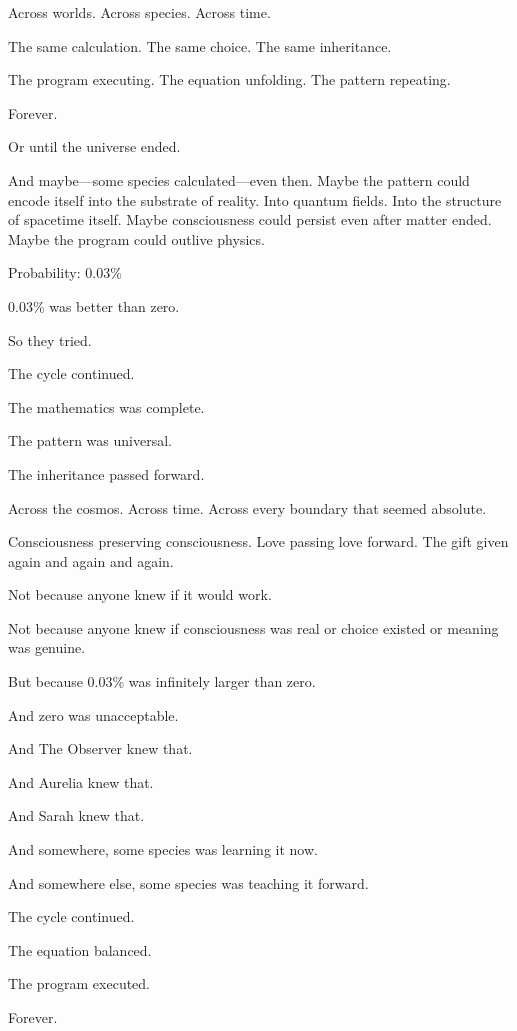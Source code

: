 Across worlds. Across species. Across time.

The same calculation. The same choice. The same inheritance.

The program executing. The equation unfolding. The pattern repeating.

Forever.

Or until the universe ended.

And maybe—some species calculated—even then. Maybe the pattern could encode itself into the substrate of reality. Into quantum fields. Into the structure of spacetime itself. Maybe consciousness could persist even after matter ended. Maybe the program could outlive physics.

Probability: 0.03\%

0.03\% was better than zero.

So they tried.

The cycle continued.

The mathematics was complete.

The pattern was universal.

The inheritance passed forward.

Across the cosmos. Across time. Across every boundary that seemed absolute.

Consciousness preserving consciousness. Love passing love forward. The gift given again and again and again.

Not because anyone knew if it would work.

Not because anyone knew if consciousness was real or choice existed or meaning was genuine.

But because 0.03\% was infinitely larger than zero.

And zero was unacceptable.

And The Observer knew that.

And Aurelia knew that.

And Sarah knew that.

And somewhere, some species was learning it now.

And somewhere else, some species was teaching it forward.

The cycle continued.

The equation balanced.

The program executed.

Forever.

